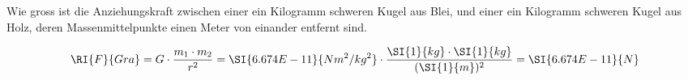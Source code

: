 
\begin{aufgabe}
	Wie gross ist die Anziehungskraft zwischen einer ein Kilogramm schweren Kugel aus Blei, und einer ein Kilogramm schweren Kugel aus Holz, deren
	Massenmittelpunkte einen Meter von einander entfernt sind.
	\begin{loesung}
		\begin{eqnarray*}
			\RI{F}{Gra} = G \cdot \frac{m_1 \cdot m_2}{r^2} = \SI{6.674E-11}{Nm^2/kg^2}\cdot\frac{\SI{1}{kg}\cdot\SI{1}{kg}}{(\SI{1}{m})^2}=\SI{6.674E-11}{N}
		\end{eqnarray*}
	\end{loesung}
\end{aufgabe}
